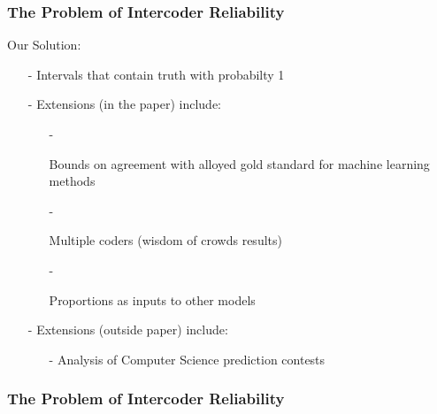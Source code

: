 \documentclass{beamer}
\numberwithin{equation}{section}
\begin{document}
\begin{frame}
\frametitle{The Problem of Intercoder Reliability}

\Large 
Our Solution:
\begin{itemize}
\item[-] Intervals that contain truth with probabilty 1
\item[-] Extensions (in the paper) include:
\begin{itemize}
\item[-] \begin{large} Bounds on agreement with alloyed gold standard for machine learning methods \end{large}
\item[-]\begin{large}  Multiple coders (wisdom of crowds results) \end{large}
\item[-]\begin{large}  Proportions as inputs to other models \end{large}
\end{itemize}
\item[-] Extensions (outside paper) include:
\begin{itemize}
\item[-] Analysis of Computer Science prediction contests
\end{itemize}
\end{itemize}


\end{frame}

\begin{frame}
\frametitle{The Problem of Intercoder Reliability}

\huge 
\pause 
\begin{itemize}
 \pause 
{} 
\end{itemize}
\end{frame}
\end{document}
